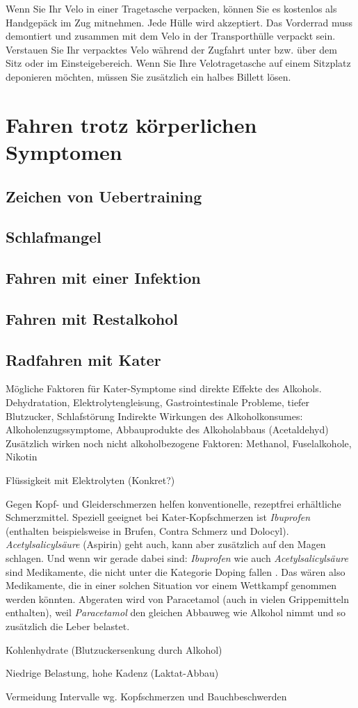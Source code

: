 \documentclass[a4paper,DIV13,BCOR1cm]{scrbook}
\begin{document}
Wenn Sie Ihr Velo in einer Tragetasche verpacken, können Sie es kostenlos als Handgepäck im Zug mitnehmen.
Jede Hülle wird akzeptiert. Das Vorderrad muss demontiert und zusammen mit dem Velo in der Transporthülle verpackt sein.
Verstauen Sie Ihr verpacktes Velo während der Zugfahrt unter bzw. über dem Sitz oder im Einsteigebereich.
Wenn Sie Ihre Velotragetasche auf einem Sitzplatz deponieren möchten, müssen Sie zusätzlich ein halbes Billett lösen.


\section{Fahren trotz körperlichen Symptomen}

\subsection{Zeichen von Uebertraining}

\subsection{Schlafmangel}

\subsection{Fahren mit einer Infektion}

\subsection{Fahren mit Restalkohol}

\subsection{Radfahren mit Kater}
\cite{Hurford2015hangover}

Mögliche Faktoren für Kater-Symptome \cite{swift1998alcohol} sind direkte Effekte des Alkohols.
Dehydratation, Elektrolytengleisung, Gastrointestinale Probleme, tiefer Blutzucker, Schlafstörung
Indirekte Wirkungen des Alkoholkonsumes:
Alkoholenzugssymptome, Abbauprodukte des Alkoholabbaus (Acetaldehyd)
Zusätzlich wirken noch nicht alkoholbezogene Faktoren: Methanol, Fuselalkohole, Nikotin

Flüssigkeit mit Elektrolyten (Konkret?)

Gegen Kopf- und Gleiderschmerzen helfen konventionelle, rezeptfrei erhältliche Schmerzmittel.
Speziell geeignet bei Kater-Kopfschmerzen ist \textsl{Ibuprofen}
(enthalten beispielsweise in Brufen, Contra Schmerz und Dolocyl).
\textsl{Acetylsalicylsäure} (Aspirin) geht auch, kann aber zusätzlich auf den Magen schlagen.
Und wenn wir gerade dabei sind: \textsl{Ibuprofen} wie auch \textsl{Acetylsalicylsäure}
sind Medikamente, die nicht unter die Kategorie Doping fallen \cite{nada2014erlaubtemedikamente}.
Das wären also Medikamente, die in einer solchen Situation vor einem Wettkampf genommen werden könnten.
Abgeraten wird von Paracetamol (auch in vielen Grippemitteln enthalten),
weil \textsl{Paracetamol} den gleichen Abbauweg wie Alkohol nimmt und so zusätzlich die Leber belastet.

Kohlenhydrate (Blutzuckersenkung durch Alkohol)

Niedrige Belastung, hohe Kadenz (Laktat-Abbau)

Vermeidung Intervalle wg. Kopfschmerzen und Bauchbeschwerden

\backmatter



\end{document}
